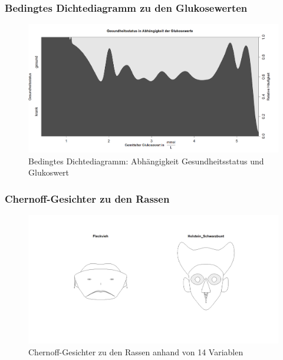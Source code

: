 \documentclass{beamer}
\begin{document}
	\begin{frame}
		\frametitle{Bedingtes Dichtediagramm zu den Glukosewerten}
		\begin{figure}[h]
			\centering
			\includegraphics[scale=0.33]{Bedingtes Dichtediagramm.png}
			\vspace{-0.6cm}
			\caption{Bedingtes Dichtediagramm: Abhängigkeit Gesundheitsstatus  und Glukoswert}
		\end{figure}
	\end{frame}
	\begin{frame}
		\frametitle{Chernoff-Gesichter zu den Rassen}
	\begin{figure}[h]
		\centering
		\includegraphics[width=1\textwidth]{Chernoff-Gesichter.png}
		\vspace{-0.6cm}
		\caption{Chernoff-Gesichter zu den Rassen anhand von 14 Variablen}
	\end{figure}
	\end{frame}
	
\end{document}

